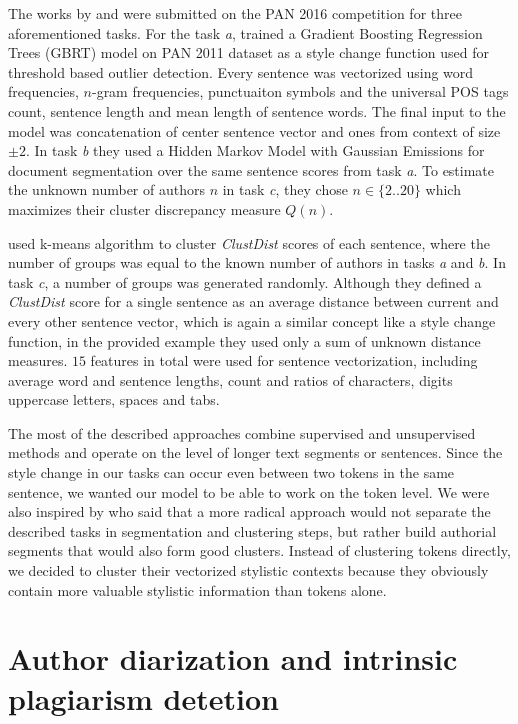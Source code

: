 \documentclass[10pt, a4paper]{article}
\begin{document}
The works by \citet{kuznetsov-2016} and \citet{sittar-2016} were submitted on the PAN 2016 competition for three aforementioned tasks. For the task \emph{a}, \citet{kuznetsov-2016} trained a Gradient Boosting Regression Trees (GBRT) model on PAN 2011 dataset as a style change function used for threshold based outlier detection. Every sentence was vectorized using word frequencies, $n$-gram frequencies, punctuaiton symbols and the universal POS tags count, sentence length and mean length of sentence words. The final input to the model was concatenation of center sentence vector and ones from context of size $\pm2$. In task \emph{b} they used a Hidden Markov Model with Gaussian Emissions for document segmentation over the same sentence scores from task \emph{a}. To estimate the unknown number of authors $n$ in task \emph{c}, they chose $n\in\{2..20\}$ which maximizes their cluster discrepancy measure $Q(n)$.

\citet{sittar-2016} used k-means algorithm to cluster \textit{ClustDist} scores of each sentence, where the number of groups was equal to the known number of authors in tasks \emph{a} and \emph{b}. In task \emph{c}, a number of groups was generated randomly. Although they defined a \emph{ClustDist} score for a single sentence as an average distance between current and every other sentence vector, which is again a similar concept like a style change function, in the provided example they used only a sum of unknown distance measures. $15$ features in total were used for sentence vectorization, including average word and sentence lengths, count and ratios of characters, digits uppercase letters, spaces and tabs. 

The most of the described approaches combine supervised and unsupervised methods and operate on the level of longer text segments or sentences. Since the style change in our tasks can occur even between two tokens in the same sentence, we wanted our model to be able to work on the token level. We were also inspired by \citet{brooke-2013} who said that a more radical approach would not separate the described tasks in segmentation and clustering steps, but rather build authorial segments that would also form good clusters. Instead of clustering tokens directly, we decided to cluster their vectorized stylistic contexts because they obviously contain more valuable stylistic information than tokens alone.

\section{Author diarization and intrinsic plagiarism detetion} \label{sec:author-diraization}
\end{document}
